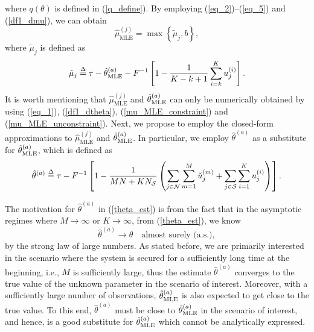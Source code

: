 \documentclass[11pt, draftclsnofoot, onecolumn]{IEEEtran}
\newcommand{\cu}{{\check{u}}}
\begin{document}
where $q( \theta  )$ is defined in (\ref{q_define}). By employing (\ref{eq_2})--(\ref{eq_5}) and (\ref{df1_dmu}), we can obtain
\begin{equation} \label{mu_MLE_constraint}
{{\hat \mu }_{\text{MLE}}^{(j)}} = \max \left\{ {{{\tilde \mu }_j},b} \right\},
\end{equation}
where ${\tilde \mu }_j$ is defined as
\begin{equation} \label{mu_MLE_unconstraint}
{{\tilde \mu }_j} \buildrel \Delta \over = \tau  - \hat \theta _{{\rm{MLE}}}^{(a)} - {F^{ - 1}}\left[ {1 - \frac{1}{{K - k + 1}}\sum\limits_{i = k}^K {u_j^{(i)}} } \right].
\end{equation}
It is worth mentioning that ${{\hat \mu }_{\text{MLE}}^{(j)}}$ and $\hat \theta _{{\rm{MLE}}}^{(a)}$ can only be numerically obtained by using (\ref{eq_1}), (\ref{df1_dtheta}), (\ref{mu_MLE_constraint}) and (\ref{mu_MLE_unconstraint}). 
Next, we propose to employ the closed-form approximations to ${{\hat \mu }_{\text{MLE}}^{(j)}}$ and $\hat \theta _{{\rm{MLE}}}^{(a)}$. 
In particular, we employ ${\hat \theta}^{(a)}$ as a substitute for $\hat \theta _{{\rm{MLE}}}^{(a)}$, which is defined as
\begin{equation} \label{theta_est}
{{\hat \theta }^{(a)}} \buildrel \Delta \over = \tau   - {F^{ - 1}}\left[ {1 - \frac{1}{{MN + K{N_{\cal S}}}}\left( {\sum\limits_{j \in {\cal N}} {\sum\limits_{m = 1}^M {\cu_j^{(m)}} }  + \sum\limits_{j \in {\cal S}} {\sum\limits_{i = 1}^K {u_j^{(i)}} } } \right)} \right].
\end{equation}

The motivation for ${{\hat \theta }^{(a)}}$ in (\ref{theta_est}) is from the fact that in the asymptotic regimes where $M \to \infty$ or $K \to \infty$, from (\ref{theta_est}), we know
\begin{equation}
{{\hat \theta }^{(a)}} \to \theta \quad \text{almost surely (a.s.)},
\end{equation}
by the strong law of large numbers.
As stated before, we are primarily interested in the scenario where the system is secured for a sufficiently long time at the beginning, i.e., $M$ is sufficiently large, thus the estimate ${{\hat \theta }^{(a)}}$ converges to the true value of the unknown parameter in the scenario of interest. Moreover, with a sufficiently large number of observations, $\hat \theta _{{\rm{MLE}}}^{(a)}$ is also expected to get close to the true value. To this end, ${{\hat \theta }^{(a)}}$  must be close to $\hat \theta _{{\rm{MLE}}}^{(a)}$ in the scenario of interest, and hence, is a good substitute for $\hat \theta _{{\rm{MLE}}}^{(a)}$ which cannot be analytically expressed.
\end{document}
